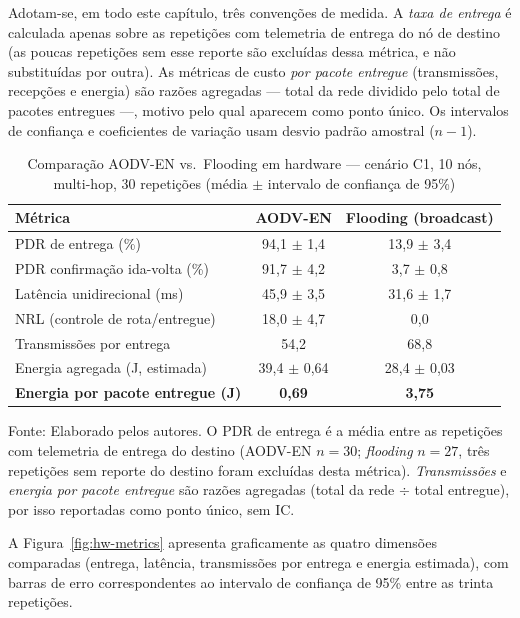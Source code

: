 Adotam-se, em todo este capítulo, três convenções de medida. A \emph{taxa de
entrega} é calculada apenas sobre as repetições com telemetria de entrega do
nó de destino (as poucas repetições sem esse reporte são excluídas dessa
métrica, e não substituídas por outra). As métricas de custo \emph{por pacote
entregue} (transmissões, recepções e energia) são razões agregadas --- total
da rede dividido pelo total de pacotes entregues ---, motivo pelo qual
aparecem como ponto único. Os intervalos de confiança e coeficientes de
variação usam desvio padrão amostral ($n-1$).

\begin{table}[H]
\centering
\caption{Comparação AODV-EN vs.~Flooding em hardware --- cenário C1, 10 nós, multi-hop, 30 repetições (média $\pm$ intervalo de confiança de 95\%)}\label{tab:comparacao}
\begin{tabular}{@{}lcc@{}}
\toprule
Métrica & AODV-EN & Flooding (broadcast) \\
\midrule
PDR de entrega (\%) & 94,1 $\pm$ 1,4 & 13,9 $\pm$ 3,4 \\
PDR confirmação ida-volta (\%) & 91,7 $\pm$ 4,2 & 3,7 $\pm$ 0,8 \\
Latência unidirecional (ms) & 45,9 $\pm$ 3,5 & 31,6 $\pm$ 1,7 \\
NRL (controle de rota/entregue) & 18,0 $\pm$ 4,7 & 0,0 \\
Transmissões por entrega & 54,2 & 68,8 \\
Energia agregada (J, estimada) & 39,4 $\pm$ 0,64 & 28,4 $\pm$ 0,03 \\
\textbf{Energia por pacote entregue (J)} & \textbf{0,69} & \textbf{3,75} \\
\bottomrule
\end{tabular}

\vspace{2pt}
{\footnotesize Fonte: Elaborado pelos autores. O PDR de entrega é a média entre as
repetições com telemetria de entrega do destino (AODV-EN $n=30$; \emph{flooding} $n=27$,
três repetições sem reporte do destino foram excluídas desta métrica). \emph{Transmissões}
e \emph{energia por pacote entregue} são razões agregadas (total da rede $\div$ total
entregue), por isso reportadas como ponto único, sem IC.}
\end{table}

A Figura~\ref{fig:hw-metrics} apresenta graficamente as quatro
dimensões comparadas (entrega, latência, transmissões por entrega e
energia estimada), com barras de erro correspondentes ao intervalo de
confiança de 95\% entre as trinta repetições.

